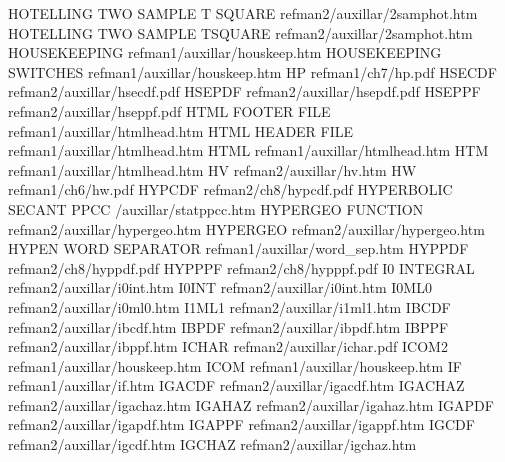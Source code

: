 HOTELLING TWO SAMPLE T SQUARE           refman2/auxillar/2samphot.htm
HOTELLING TWO SAMPLE TSQUARE            refman2/auxillar/2samphot.htm
HOUSEKEEPING                            refman1/auxillar/houskeep.htm
HOUSEKEEPING SWITCHES                   refman1/auxillar/houskeep.htm
HP                                      refman1/ch7/hp.pdf
HSECDF                                  refman2/auxillar/hsecdf.pdf
HSEPDF                                  refman2/auxillar/hsepdf.pdf
HSEPPF                                  refman2/auxillar/hseppf.pdf
HTML FOOTER FILE                        refman1/auxillar/htmlhead.htm
HTML HEADER FILE                        refman1/auxillar/htmlhead.htm
HTML                                    refman1/auxillar/htmlhead.htm
HTM                                     refman1/auxillar/htmlhead.htm
HV                                      refman2/auxillar/hv.htm
HW                                      refman1/ch6/hw.pdf
HYPCDF                                  refman2/ch8/hypcdf.pdf
HYPERBOLIC SECANT PPCC                  /auxillar/statppcc.htm
HYPERGEO FUNCTION                       refman2/auxillar/hypergeo.htm
HYPERGEO                                refman2/auxillar/hypergeo.htm
HYPEN WORD SEPARATOR                    refman1/auxillar/word_sep.htm
HYPPDF                                  refman2/ch8/hyppdf.pdf
HYPPPF                                  refman2/ch8/hypppf.pdf
I0 INTEGRAL                             refman2/auxillar/i0int.htm
I0INT                                   refman2/auxillar/i0int.htm
I0ML0                                   refman2/auxillar/i0ml0.htm
I1ML1                                   refman2/auxillar/i1ml1.htm
IBCDF                                   refman2/auxillar/ibcdf.htm
IBPDF                                   refman2/auxillar/ibpdf.htm
IBPPF                                   refman2/auxillar/ibppf.htm
ICHAR                                   refman2/auxillar/ichar.pdf
ICOM2                                   refman1/auxillar/houskeep.htm
ICOM                                    refman1/auxillar/houskeep.htm
IF                                      refman1/auxillar/if.htm
IGACDF                                  refman2/auxillar/igacdf.htm
IGACHAZ                                 refman2/auxillar/igachaz.htm
IGAHAZ                                  refman2/auxillar/igahaz.htm
IGAPDF                                  refman2/auxillar/igapdf.htm
IGAPPF                                  refman2/auxillar/igappf.htm
IGCDF                                   refman2/auxillar/igcdf.htm
IGCHAZ                                  refman2/auxillar/igchaz.htm
